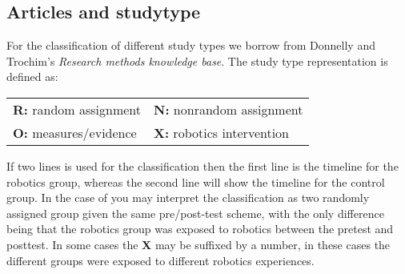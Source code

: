 \subsection*{Articles and studytype}
For the classification of different study types we borrow from Donnelly and Trochim's \textit{Research methods knowledge base}\cite{donnelly2007research}. 
The study type representation is defined as:

\bigskip\noindent
\begin{center}
	\begin{tabular}{ll}
		\textbf{R:} random assignment & \textbf{N:} nonrandom assignment\\
		\textbf{O:} measures/evidence & \textbf{X:} robotics intervention
		\label{tab:typedesc}
	\end{tabular}
\end{center}

\bigskip\noindent
If two lines is used for the classification then the first line is the timeline for the robotics group, whereas the second line will show the timeline for the control group.
In the case of  you may interpret the classification as two randomly assigned group given the same pre/post-test scheme, with the only difference being that the robotics group was exposed to robotics between the pretest and posttest. In some cases the \textbf{X} may be suffixed by a number, in these cases the different groups were exposed to different robotics experiences.



